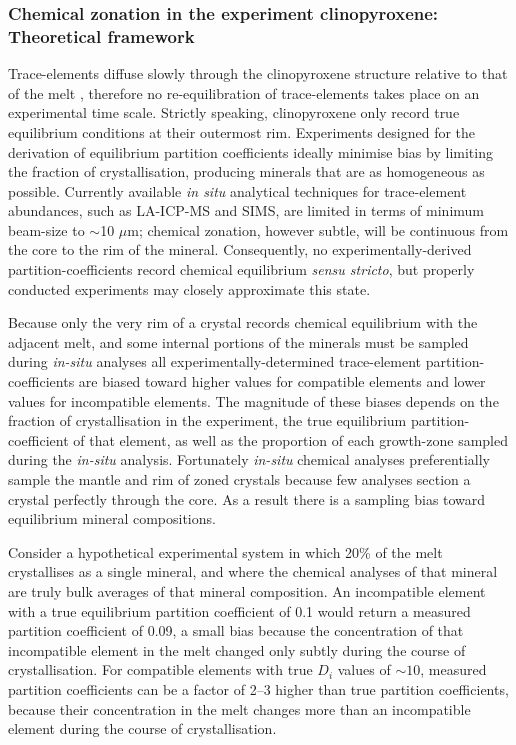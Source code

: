 \documentclass[final,authoryear,3p,times,twocolumn]{elsarticle}
\begin{document}
\subsubsection{Chemical zonation in the experiment clinopyroxene: Theoretical framework}
Trace-elements diffuse slowly through the clinopyroxene structure relative to that of the melt \citep{VanOrman2001, Zhang2010}, therefore no re-equilibration of trace-elements takes place on an experimental time scale. Strictly speaking, clinopyroxene only record true equilibrium conditions at their outermost rim. 
     Experiments designed for the derivation of equilibrium partition coefficients ideally minimise bias by limiting the fraction of crystallisation, producing minerals that are as homogeneous as possible. Currently available \textit{in situ} analytical techniques for trace-element abundances, such as LA-ICP-MS and SIMS, are limited in terms of minimum beam-size to $\sim$10 $\mu$m; chemical zonation, however subtle, will be continuous from the core to the rim of the mineral. Consequently, no experimentally-derived partition-coefficients record chemical equilibrium \textit{sensu stricto}, but properly conducted experiments may closely approximate this state.

Because only the very rim of a crystal records chemical equilibrium with the adjacent melt, and some internal portions of the minerals must be sampled during \textit{in-situ} analyses all experimentally-determined trace-element partition-coefficients are biased toward higher values for compatible elements and lower values for incompatible elements. The magnitude of these biases depends on the fraction of crystallisation in the experiment, the true equilibrium partition-coefficient of that element, as well as the proportion of each growth-zone sampled during the \textit{in-situ} analysis. Fortunately \textit{in-situ} chemical analyses preferentially sample the mantle and rim of zoned crystals because few analyses section a crystal perfectly through the core. As a result there is a sampling bias toward equilibrium mineral compositions.


	Consider a hypothetical experimental system in which 20\% of the melt crystallises as a single mineral, and where the chemical analyses of that mineral are truly bulk averages of that mineral composition. An incompatible element with a true equilibrium partition coefficient of 0.1 would return a measured partition coefficient of 0.09, a small bias because the concentration of that incompatible element in the melt changed only subtly during the course of crystallisation. For compatible elements with true $D_i$ values of $\sim 10$, measured partition coefficients can be a factor of 2--3 higher than true partition coefficients, because their concentration in the melt changes more than an incompatible element during the course of crystallisation.
\end{document}
